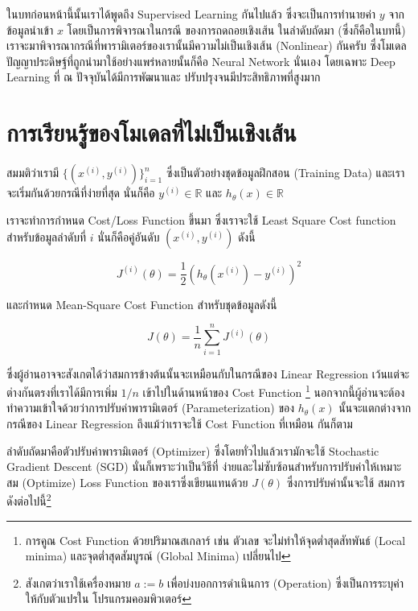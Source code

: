 ในบทก่อนหน้านี้นั้นเราได้พูดถึง Supervised Learning กันไปแล้ว ซึ่งจะเป็นการทำนายค่า $y$ จากข้อมูลนำเข้า $x$ โดยเป็นการพิจารณาในกรณี%
ของการถดถอยเชิงเส้น ในลำดับถัดมา (ซึ่งก็คือในบทนี้) เราจะมาพิจารณากรณีที่พารามิเตอร์ของเรานั้นมีความไม่เป็นเชิงเส้น (Nonlinear) กันครับ
ซึ่งโมเดลปัญญาประดิษฐ์ที่ถูกนำมาใช้อย่างแพร่หลายนั้นก็คือ Neural Network นั่นเอง โดยเฉพาะ Deep Learning ที่ ณ ปัจจุบันได้มีการพัฒนาและ%
ปรับปรุงจนมีประสิทธิภาพที่สูงมาก

\section{การเรียนรู้ของโมเดลที่ไม่เป็นเชิงเส้น}
\label{sec:nonlinear_ml}

สมมติว่าเรามี $\{(x^{(i)}, y^{(i)})\}^n_{i=1}$ ซึ่งเป็นตัวอย่างชุดข้อมูลฝึกสอน (Training Data) และเราจะเริ่มกันด้วยกรณีที่ง่ายที่สุด%
นั่นก็คือ $y^{(i)} \in \mathbb{R}$ และ $h_\theta(x) \in \mathbb{R}$ 

เราจะทำการกำหนด Cost/Loss Function ขึ้นมา ซึ่งเราจะใช้ Least Square Cost function สำหรับข้อมูลลำดับที่ $i$ นั่นก็คือคู่อันดับ 
$(x^{(i)} ,y^{(i)} )$ ดังนี้ 

\begin{equation}\label{eq:loss}
    J^{(i)} (\theta) = \frac{1}{2} \left(h_\theta (x^{(i)}) - y^{(i)}\right)^2
\end{equation}

\noindent และกำหนด Mean-Square Cost Function สำหรับชุดข้อมูลดังนี้

\begin{equation}\label{eq:mse_loss}
    J(\theta) = \frac 1 n \sum_{i=1}^n J^{(i)}(\theta)
\end{equation}

\noindent ซึ่งผู้อ่านอาจจะสังเกตได้ว่าสมการข้างต้นนั้นจะเหมือนกับในกรณีของ Linear Regression เว้นแต่จะต่างกันตรงที่เราได้มีการเพิ่ม $1/n$
เข้าไปในด้านหน้าของ Cost Function \footnote{การคูณ Cost Function ด้วยปริมาณสเกลาร์ เช่น ตัวเลข จะไม่ทำให้จุดต่ำสุดสัทพันธ์ 
(Local minima) และจุดต่ำสุดสัมบูรณ์ (Global Minima) เปลี่ยนไป} นอกจากนี้ผู้อ่านจะต้องทำความเข้าใจด้วยว่าการปรับค่าพารามิเตอร์ 
(Parameterization) ของ $h_\theta(x)$ นั้นจะแตกต่างจากกรณีของ Linear Regression ถึงแม้ว่าเราจะใช้ Cost Function ที่เหมือน%
กันก็ตาม 

ลำดับถัดมาคือตัวปรับค่าพารามิเตอร์ (Optimizer) ซึ่งโดยทั่วไปแล้วเรามักจะใช้ Stochastic Gradient Descent (SGD) นั่นก็เพราะว่าเป็นวิธีที่%
ง่ายและไม่ซับซ้อนสำหรับการปรับค่าให้เหมาะสม (Optimize) Loss Function ของเราซึ่งเขียนแทนด้วย $J(\theta)$ ซึ่งการปรับค่านั้นจะใช้%
สมการดังต่อไปนี้\footnote{สังเกตว่าเราใช้เครื่องหมาย $a := b$ เพื่อบ่งบอกการดำเนินการ (Operation) ซึ่งเป็นการระบุค่าให้กับตัวแปรใน%
โปรแกรมคอมพิวเตอร์}

